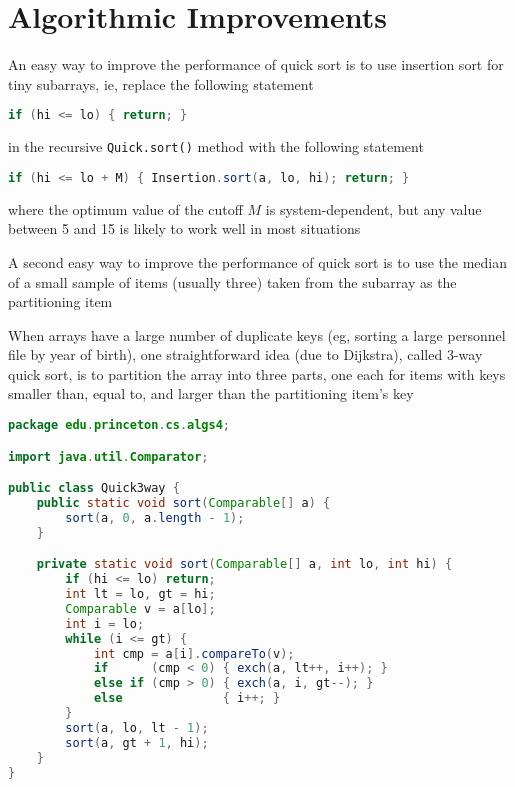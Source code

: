 \documentclass[8pt,a4paper,compress]{beamer}
\begin{document}
\section{Algorithmic Improvements}
\begin{frame}[fragile]
\pause

An easy way to improve the performance of quick sort is to use insertion sort for tiny subarrays, ie, replace the following statement 
\begin{lstlisting}[language=Java]
if (hi <= lo) { return; }
\end{lstlisting}
in the recursive \lstinline{Quick.sort()} method with the following statement
\begin{lstlisting}[language=Java]
if (hi <= lo + M) { Insertion.sort(a, lo, hi); return; }
\end{lstlisting}
where the optimum value of the cutoff $M$ is system-dependent, but any value between 5 and 15 is likely to work well in most situations

\pause
\bigskip

A second easy way to improve the performance of quick sort is to use the median of a small sample of items (usually three) taken from the subarray as the partitioning item
\end{frame}

\begin{frame}[fragile]
\pause

When arrays have a large number of duplicate keys (eg, sorting a large personnel file by year of birth), one straightforward idea (due to Dijkstra), called 3-way quick sort, is to partition the array into three parts, one each for items with keys smaller than, equal to, and larger than the partitioning item's key

\pause

\begin{lstlisting}[language=Java]
package edu.princeton.cs.algs4;

import java.util.Comparator;

public class Quick3way {
    public static void sort(Comparable[] a) {
        sort(a, 0, a.length - 1);
    }

    private static void sort(Comparable[] a, int lo, int hi) { 
        if (hi <= lo) return;
        int lt = lo, gt = hi;
        Comparable v = a[lo];
        int i = lo;
        while (i <= gt) {
            int cmp = a[i].compareTo(v);
            if      (cmp < 0) { exch(a, lt++, i++); }
            else if (cmp > 0) { exch(a, i, gt--); }
            else              { i++; }
        }
        sort(a, lo, lt - 1);
        sort(a, gt + 1, hi);
    }
}
\end{lstlisting}
\end{frame}
\end{document}
